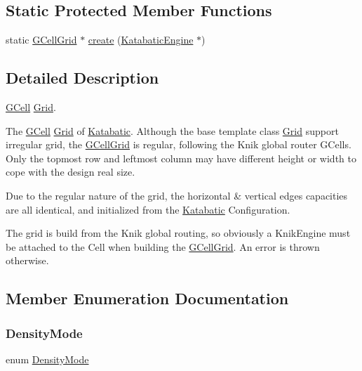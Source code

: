 \subsection*{Static Protected Member Functions}
\begin{DoxyCompactItemize}
\item 
static \hyperlink{classKatabatic_1_1GCellGrid}{G\+Cell\+Grid} $\ast$ \hyperlink{classKatabatic_1_1GCellGrid_a19a45b2e6c6b9ca8898b2fde035d1827}{create} (\hyperlink{classKatabatic_1_1KatabaticEngine}{Katabatic\+Engine} $\ast$)
\end{DoxyCompactItemize}


\subsection{Detailed Description}
\hyperlink{classKatabatic_1_1GCell}{G\+Cell} \hyperlink{classKatabatic_1_1Grid}{Grid}. 

The \hyperlink{classKatabatic_1_1GCell}{G\+Cell} \hyperlink{classKatabatic_1_1Grid}{Grid} of \hyperlink{namespaceKatabatic}{Katabatic}. Although the base template class \hyperlink{classKatabatic_1_1Grid}{Grid} support irregular grid, the \hyperlink{classKatabatic_1_1GCellGrid}{G\+Cell\+Grid} is regular, following the Knik global router G\+Cells. Only the topmost row and leftmost column may have different height or width to cope with the design real size.

Due to the regular nature of the grid, the horizontal \& vertical edges capacities are all identical, and initialized from the \hyperlink{namespaceKatabatic}{Katabatic} Configuration.

The grid is build from the Knik global routing, so obviously a Knik\+Engine must be attached to the Cell when building the \hyperlink{classKatabatic_1_1GCellGrid}{G\+Cell\+Grid}. An error is thrown otherwise. 

\subsection{Member Enumeration Documentation}
\mbox{\label{classKatabatic_1_1GCellGrid_a07884f5e1af410e98208fed76a2b40fe}} 
\subsubsection{\texorpdfstring{Density\+Mode}{DensityMode}}
{\footnotesize\ttfamily enum \hyperlink{classKatabatic_1_1GCellGrid_a07884f5e1af410e98208fed76a2b40fe}{Density\+Mode}}


